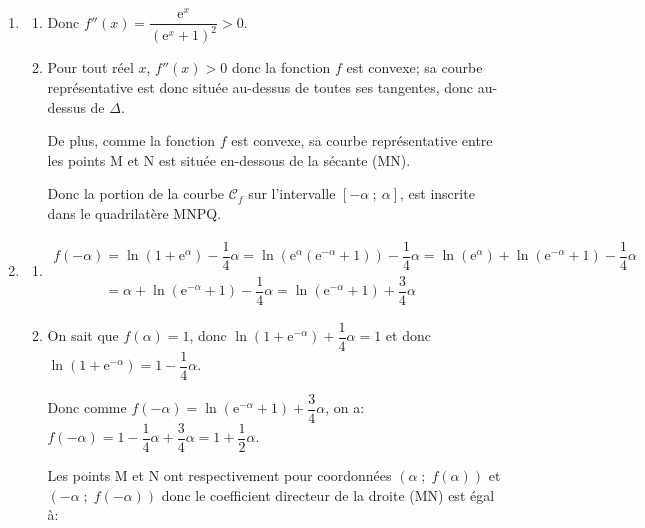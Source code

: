 \documentclass[10pt]{article}
\providecommand{\e}{{\mathrm{e}}}
\begin{document}
\smallskip

\begin{enumerate}
\item 
	\begin{enumerate}
		\item 
{}		

Donc $f''(x) = \dfrac{\e^x}{\left(\e^x + 1\right)^2}>0$.

		\item
Pour tout réel $x$, $f''(x)>0$ donc la fonction $f$ est convexe; sa courbe représentative est donc située au-dessus de toutes ses tangentes, donc au-dessus de $\Delta$.

De plus, comme la fonction $f$ est convexe, sa courbe représentative entre les points M et N est située en-dessous de la sécante (MN).

Donc  la portion de la courbe $\mathcal{C}_f$ sur l'intervalle $[-\alpha~;~\alpha]$, est inscrite dans le quadrilatère MNPQ.
	\end{enumerate}
	
\item 	
	\begin{enumerate}
		\item 
$\begin{gathered}f(-\alpha) = \ln\left (1+\e^{\alpha}\right ) -\dfrac{1}{4}\alpha
= \ln \left (\e^{\alpha} \left (\e^{-\alpha}+1\right )\right ) -\dfrac{1}{4}\alpha
= \ln\left (\e^{\alpha}\right ) + \ln \left (\e^{-\alpha}+1\right ) -\dfrac{1}{4}\alpha\\[7pt]
\phantom{f(-\alpha)}
= \alpha + \ln \left (\e^{-\alpha}+1\right ) -\dfrac{1}{4}\alpha
= \ln \left (\e^{-\alpha}+1\right )+ \dfrac{3}{4}\alpha\end{gathered}$
		
		\item 
On sait que $f(\alpha)=1$, donc $\ln\left (1+\e^{-\alpha}\right )+\dfrac{1}{4}\alpha = 1$ et donc $\ln\left (1+\e^{-\alpha}\right ) = 1-\dfrac{1}{4}\alpha$.

Donc comme $f(-\alpha) = \ln \left (\e^{-\alpha}+1\right )+ \dfrac{3}{4}\alpha$, on a:
$f(-\alpha) = 1-\dfrac{1}{4}\alpha + \dfrac{3}{4}\alpha = 1+\dfrac{1}{2}\alpha$.


Les points M et N ont respectivement pour coordonnées $\left (\alpha\;;\;f(\alpha)\right )$ et $\left (-\alpha\;;\;f(-\alpha)\right )$ donc le coefficient directeur de la droite (MN) est égal à:


\end{enumerate}
\end{enumerate}
\end{document}
